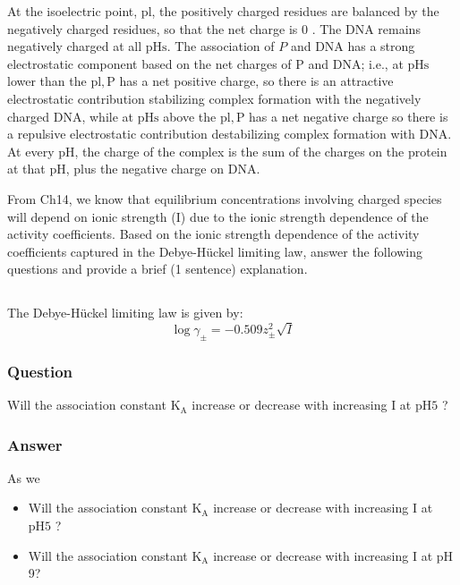 \documentclass[12pt]{article}
\begin{document}
At the isoelectric point, $\mathrm{pl}$, the positively charged residues are balanced by the negatively charged residues, so that the net charge is 0 . The DNA remains negatively charged at all $\mathrm{pHs}$. The association of $P$ and DNA has a strong electrostatic component based on the net charges of $\mathrm{P}$ and $\mathrm{DNA}$; i.e., at $\mathrm{pHs}$ lower than the $\mathrm{pl}, \mathrm{P}$ has a net positive charge, so there is an attractive electrostatic contribution stabilizing complex formation with the negatively charged DNA, while at $\mathrm{pHs}$ above the $\mathrm{pl}, \mathrm{P}$ has a net negative charge so there is a repulsive electrostatic contribution destabilizing complex formation with DNA. At every $\mathrm{pH}$, the charge of the complex is the sum of the charges on the protein at that $\mathrm{pH}$, plus the negative charge on DNA.

From Ch14, we know that equilibrium concentrations involving charged species will depend on ionic strength (I) due to the ionic strength dependence of the activity coefficients. Based on the ionic strength dependence of the activity coefficients captured in the Debye-Hückel limiting law, answer the following questions and provide a brief (1 sentence) explanation.

\subsection{}
The Debye-Hückel limiting law is given by:
\begin{equation}
\log \gamma_{\pm}=-0.509 z_{\pm}^{2} \sqrt{I}
\end{equation}
\subsubsection{Question}
Will the association constant $\mathrm{K}_{\mathrm{A}}$ increase or decrease with increasing I at $\mathrm{pH} 5$ ?
\subsubsection{Answer}
As we 


\begin{itemize}
  \item Will the association constant $\mathrm{K}_{\mathrm{A}}$ increase or decrease with increasing I at $\mathrm{pH} 5$ ?
  \item Will the association constant $\mathrm{K}_{\mathrm{A}}$ increase or decrease with increasing I at $\mathrm{pH}$ 9?
\end{itemize}
\end{document}
